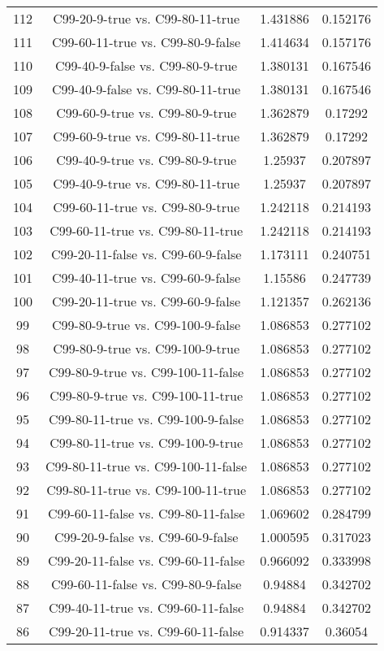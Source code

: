 \documentclass[a4paper,10pt]{article}
\begin{document}
\begin{landscape}
\begin{table}[!htp]
\begin{tabular}{cccc}
112&C99-20-9-true vs. C99-80-11-true&1.431886&0.152176\\
111&C99-60-11-true vs. C99-80-9-false&1.414634&0.157176\\
110&C99-40-9-false vs. C99-80-9-true&1.380131&0.167546\\
109&C99-40-9-false vs. C99-80-11-true&1.380131&0.167546\\
108&C99-60-9-true vs. C99-80-9-true&1.362879&0.17292\\
107&C99-60-9-true vs. C99-80-11-true&1.362879&0.17292\\
106&C99-40-9-true vs. C99-80-9-true&1.25937&0.207897\\
105&C99-40-9-true vs. C99-80-11-true&1.25937&0.207897\\
104&C99-60-11-true vs. C99-80-9-true&1.242118&0.214193\\
103&C99-60-11-true vs. C99-80-11-true&1.242118&0.214193\\
102&C99-20-11-false vs. C99-60-9-false&1.173111&0.240751\\
101&C99-40-11-true vs. C99-60-9-false&1.15586&0.247739\\
100&C99-20-11-true vs. C99-60-9-false&1.121357&0.262136\\
99&C99-80-9-true vs. C99-100-9-false&1.086853&0.277102\\
98&C99-80-9-true vs. C99-100-9-true&1.086853&0.277102\\
97&C99-80-9-true vs. C99-100-11-false&1.086853&0.277102\\
96&C99-80-9-true vs. C99-100-11-true&1.086853&0.277102\\
95&C99-80-11-true vs. C99-100-9-false&1.086853&0.277102\\
94&C99-80-11-true vs. C99-100-9-true&1.086853&0.277102\\
93&C99-80-11-true vs. C99-100-11-false&1.086853&0.277102\\
92&C99-80-11-true vs. C99-100-11-true&1.086853&0.277102\\
91&C99-60-11-false vs. C99-80-11-false&1.069602&0.284799\\
90&C99-20-9-false vs. C99-60-9-false&1.000595&0.317023\\
89&C99-20-11-false vs. C99-60-11-false&0.966092&0.333998\\
88&C99-60-11-false vs. C99-80-9-false&0.94884&0.342702\\
87&C99-40-11-true vs. C99-60-11-false&0.94884&0.342702\\
86&C99-20-11-true vs. C99-60-11-false&0.914337&0.36054\\

\end{tabular}
\end{table}
\end{landscape}
\end{document}
